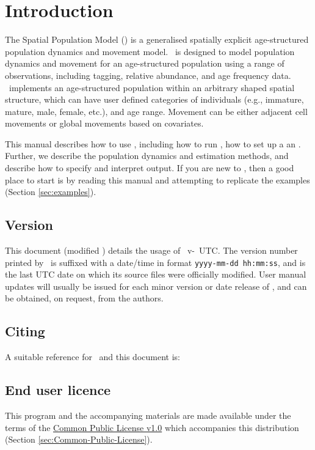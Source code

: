\section{Introduction\label{sec:Introduction}}

The Spatial Population Model (\SPM) is a generalised spatially explicit age-structured population dynamics and movement model. \SPM\ is designed to model population dynamics and movement for an age-structured population using a range of observations, including tagging, relative abundance, and age frequency data. \SPM\ implements an age-structured population within an arbitrary shaped spatial structure, which can have user defined categories of individuals (e.g., immature, mature, male, female, etc.), and age range. Movement can be either adjacent cell movements or global movements based on covariates. 

This manual describes how to use \SPM, including how to run \SPM, how to set up a an \config. Further, we describe the population dynamics and estimation methods, and describe how to specify and interpret output. If you are new to \SPM, then a good place to start is by reading this manual and attempting to replicate the examples (Section \ref{sec:examples}).

\subsection{Version}

This document (modified \DocVer) details the usage of \SPM\ v\VER-\SourceControlTimeSPM\ UTC. The version number printed by \SPM\ is suffixed with a date/time in format \texttt{yyyy-mm-dd hh:mm:ss}, and is the last UTC date on which its source files were officially modified. User manual updates will usually be issued for each minor version or date release of \SPM, and can be obtained, on request, from the authors.

\subsection{Citing \SPM}

A suitable reference for \SPM\ and this document is: 

\ManualRef

\subsection{End user licence}

This program and the accompanying materials are made available under the terms of the \href{http://www.opensource.org/licenses/cpl1.0.php}{Common Public License v1.0} which accompanies this distribution (Section \ref{sec:Common-Public-License}).

